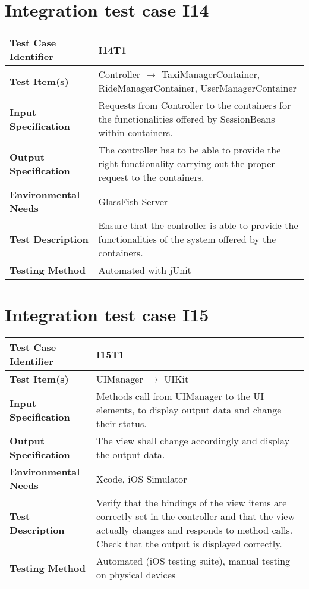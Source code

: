 \vspace{2em}

\section{Integration test case I14}

\begin{tabular}{l p{}}
    \hline
    \textbf{Test Case Identifier} & I14T1\\
    \hline
    \textbf{Test Item(s)} & Controller $\rightarrow$ TaxiManagerContainer, RideManagerContainer, UserManagerContainer \\
    \hline
    \textbf{Input Specification} & Requests from Controller to the containers for the functionalities offered by SessionBeans within containers.\\
    \hline
    \textbf{Output Specification} & The controller has to be able to provide the right functionality carrying out the proper request to the containers.\\
    \hline
    \textbf{Environmental Needs} & GlassFish Server\\
    \hline
    \textbf{Test Description} & Ensure that the controller is able to provide the functionalities of the system offered by the containers.\\
    \hline
    \textbf{Testing Method} & Automated with jUnit \\
    \hline
\end{tabular}

\vspace{2em}

\section{Integration test case I15}

\begin{tabular}{l p{}}
    \hline
    \textbf{Test Case Identifier} & I15T1\\
    \hline
    \textbf{Test Item(s)} & UIManager $\rightarrow$ UIKit \\
    \hline
    \textbf{Input Specification} & Methods call from UIManager to the UI elements, to display output data and change their status.\\
    \hline
    \textbf{Output Specification} & The view shall change accordingly and display the output data.\\
    \hline
    \textbf{Environmental Needs} & Xcode, iOS Simulator\\
    \hline
    \textbf{Test Description} & Verify that the bindings of the view items are correctly set in the controller and that the view actually changes and responds to method calls. Check that the output is displayed correctly.\\
    \hline
    \textbf{Testing Method} & Automated (iOS testing suite), manual testing on physical devices \\
    \hline
\end{tabular}

